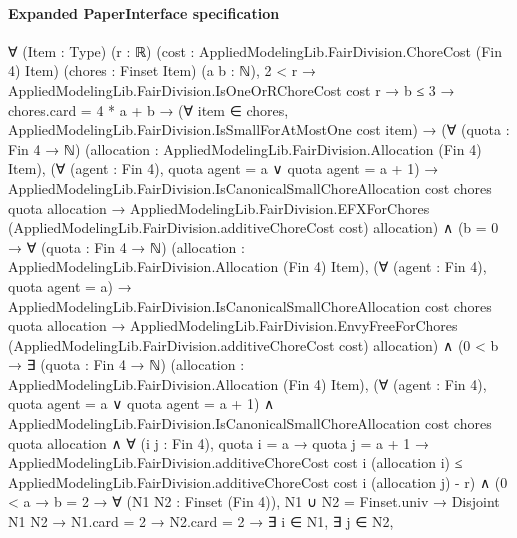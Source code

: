 \documentclass[10pt]{article}
\begin{document}
\paragraph{Expanded PaperInterface specification}
\begin{ReviewVerbatim}
∀ (Item : Type) (r : ℝ) (cost : AppliedModelingLib.FairDivision.ChoreCost (Fin 4) Item) (chores : Finset Item)
  (a b : ℕ),
  2 < r →
    AppliedModelingLib.FairDivision.IsOneOrRChoreCost cost r →
      b ≤ 3 →
        chores.card = 4 * a + b →
          (∀ item ∈ chores, AppliedModelingLib.FairDivision.IsSmallForAtMostOne cost item) →
            (∀ (quota : Fin 4 → ℕ) (allocation : AppliedModelingLib.FairDivision.Allocation (Fin 4) Item),
                (∀ (agent : Fin 4), quota agent = a ∨ quota agent = a + 1) →
                  AppliedModelingLib.FairDivision.IsCanonicalSmallChoreAllocation cost chores quota allocation →
                    AppliedModelingLib.FairDivision.EFXForChores
                      (AppliedModelingLib.FairDivision.additiveChoreCost cost) allocation) ∧
              (b = 0 →
                  ∀ (quota : Fin 4 → ℕ) (allocation : AppliedModelingLib.FairDivision.Allocation (Fin 4) Item),
                    (∀ (agent : Fin 4), quota agent = a) →
                      AppliedModelingLib.FairDivision.IsCanonicalSmallChoreAllocation cost chores quota allocation →
                        AppliedModelingLib.FairDivision.EnvyFreeForChores
                          (AppliedModelingLib.FairDivision.additiveChoreCost cost) allocation) ∧
                (0 < b →
                    ∃ (quota : Fin 4 → ℕ) (allocation : AppliedModelingLib.FairDivision.Allocation (Fin 4) Item),
                      (∀ (agent : Fin 4), quota agent = a ∨ quota agent = a + 1) ∧
                        AppliedModelingLib.FairDivision.IsCanonicalSmallChoreAllocation cost chores quota allocation ∧
                          ∀ (i j : Fin 4),
                            quota i = a →
                              quota j = a + 1 →
                                AppliedModelingLib.FairDivision.additiveChoreCost cost i (allocation i) ≤
                                  AppliedModelingLib.FairDivision.additiveChoreCost cost i (allocation j) - r) ∧
                  (0 < a →
                    b = 2 →
                      ∀ (N1 N2 : Finset (Fin 4)),
                        N1 ∪ N2 = Finset.univ →
                          Disjoint N1 N2 →
                            N1.card = 2 →
                              N2.card = 2 →
                                ∃ i ∈ N1,
                                  ∃ j ∈ N2,

\end{ReviewVerbatim}
\end{document}
